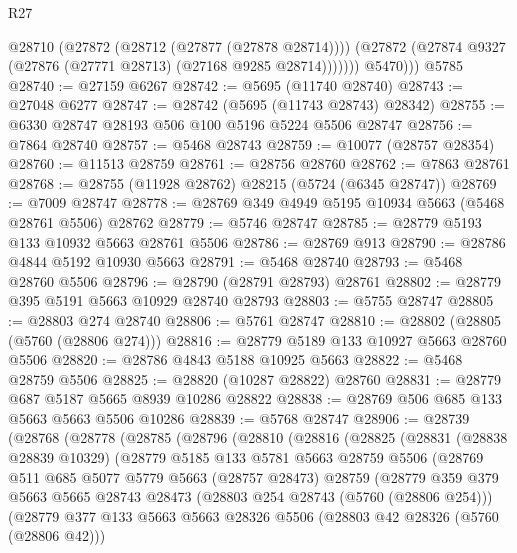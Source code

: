 \begin{lexlean}{R27}
\begin{coremodule}
            @28710
              (@27872 (@28712 (@27877 (@27878 @28714))))
              (@27872 (@27874 @9327 (@27876 (@27771 @28713) (@27168 @9285 @28714)))))))
          @5470)))
    @5785
@28740 := @27159 @6267
@28742 := @5695 (@11740 @28740)
@28743 := @27048 @6277
@28747 := @28742 (@5695 (@11743 @28743) @28342)
@28755 := @6330 @28747 @28193 @506 @100 @5196 @5224 @5506 @28747
@28756 := @7864 @28740
@28757 := @5468 @28743
@28759 := @10077 (@28757 @28354)
@28760 := @11513 @28759
@28761 := @28756 @28760
@28762 := @7863 @28761
@28768 := @28755 (@11928 @28762) @28215 (@5724 (@6345 @28747))
@28769 := @7009 @28747
@28778 := @28769 @349 @4949 @5195 @10934 @5663 (@5468 @28761 @5506) @28762
@28779 := @5746 @28747
@28785 := @28779 @5193 @133 @10932 @5663 @28761 @5506
@28786 := @28769 @913
@28790 := @28786 @4844 @5192 @10930 @5663
@28791 := @5468 @28740
@28793 := @5468 @28760 @5506
@28796 := @28790 (@28791 @28793) @28761
@28802 := @28779 @395 @5191 @5663 @10929 @28740 @28793
@28803 := @5755 @28747
@28805 := @28803 @274 @28740
@28806 := @5761 @28747
@28810 := @28802 (@28805 (@5760 (@28806 @274)))
@28816 := @28779 @5189 @133 @10927 @5663 @28760 @5506
@28820 := @28786 @4843 @5188 @10925 @5663
@28822 := @5468 @28759 @5506
@28825 := @28820 (@10287 @28822) @28760
@28831 := @28779 @687 @5187 @5665 @8939 @10286 @28822
@28838 := @28769 @506 @685 @133 @5663 @5663 @5506 @10286
@28839 := @5768 @28747
@28906 := @28739
    (@28768
      (@28778
        (@28785
          (@28796
            (@28810
              (@28816
                (@28825
                  (@28831
                    (@28838 @28839 @10329)
                    (@28779
                      @5185
                      @133
                      @5781
                      @5663
                      @28759
                      @5506
                      (@28769
                        @511
                        @685
                        @5077
                        @5779
                        @5663
                        (@28757 @28473)
                        @28759
                        (@28779
                          @359
                          @379
                          @5663
                          @5665
                          @28743
                          @28473
                          (@28803 @254 @28743 (@5760 (@28806 @254)))
                          (@28779
                            @377
                            @133
                            @5663
                            @5663
                            @28326
                            @5506
                            (@28803 @42 @28326 (@5760 (@28806 @42)))

\end{coremodule}
\end{lexlean}
